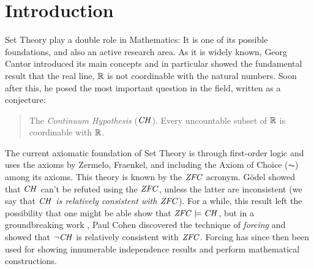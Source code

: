 \section{Introduction}\label{sec:introduction}
Set Theory play a double role in Mathematics: It is one of its
possible foundations, and also an active research area.
%
As it is widely known, Georg Cantor introduced its main concepts and in
particular showed the fundamental result that the real line, $\mathbb{R}$  is not
coordinable with the natural numbers. Soon after this, he posed the
most important question in the field, written as a conjecture:
\begin{quote}
  The \emph{Continuum Hypothesis} ($\mathit{CH}$). Every uncountable subset of $\mathbb{R}$ is
  coordinable with $\mathbb{R}$.
\end{quote}

The current  axiomatic foundation of Set Theory is through 
first-order logic and uses the axioms by  Zermelo, Fraenkel, and
including the Axiom of Choice ($\AC$) among its axioms. This theory is
known by the $\mathit{ZFC}$ acronym. G\"odel showed that $\mathit{CH}$ can't be
refuted using the $\mathit{ZFC}$, unless the latter are inconsistent (we say
that \emph{$\mathit{CH}$ is relatively 
  consistent with  $\mathit{ZFC}$}). For a while, this result left the
possibility that one might be able show that $\mathit{ZFC}\models \mathit{CH}$, but in
a groundbreaking work \cite{Cohen-CH-PNAS}, Paul Cohen discovered the
technique of 
\emph{forcing} and showed that $\neg\mathit{CH}$ is relatively consistent with
$\mathit{ZFC}$. Forcing has since then been used for showing innumerable
independence results and perform mathematical constructions.


